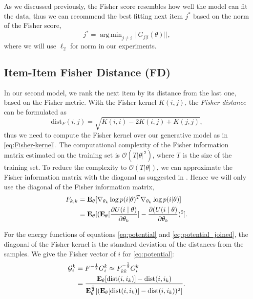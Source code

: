 \documentclass[preprint]{sig-alternate-05-2015}
\DeclareMathOperator*{\argmin}{arg\,min}
\begin{document}
As we discussed previously, the Fisher score resembles how well the model can fit the data, thus we can recommend the best fitting next item $j^{*}$ based on the norm of the Fisher score,
%
\begin{equation}
j^{*} = \argmin_{j \neq i} || G_{j|i}(\theta) ||,
\nonumber
\end{equation}
%
where we will use $\ell_2$ for norm in our experiments.

\subsection{Item-Item Fisher Distance (FD)}
\label{sect:FD}

In our second model, we rank the next item by its distance from the last one, based on the Fisher metric. With the Fisher kernel $K(i,j)$, the \emph{Fisher distance} can be formulated as
\begin{equation}
\mbox{dist}_F(i,j) = \sqrt{K(i,i) - 2 K(i,j) + K(j,j)},
\label{eq:Fisher-dist}
\end{equation}   
%
thus we need to compute the Fisher kernel over our generative model as in \eqref{eq:Fisher-kernel}.  The computational complexity of the Fisher information matrix estimated on the training set is $\mathcal{O}(T |\theta|^2)$, where $T$ is the size of the training set.  To reduce the complexity to $\mathcal{O}(T |\theta|)$, we can approximate the Fisher information matrix with the diagonal as suggested in \cite{JH,perronnin2007fisher}.
Hence we will only use the diagonal of the Fisher information matrix, 
%
\begin{equation}
\begin{split}
    F_{k,k} &={\bf E_{\theta}}[\nabla_{\theta_k} \log p(i|\theta)^T \nabla_{\theta_k} \log p(i|\theta)] \\
    &={\bf E_{\theta}}[({\bf E_{\theta}}[\frac{\partial{U(i \mid \theta)}}{\partial{\theta_k}}] - \frac{\partial{(U(i \mid \theta)}}{\partial{\theta_k}})^2] . \\
\end{split}
\nonumber
\end{equation}

For the energy functions of equations \eqref{eq:potential} and \eqref{eq:potential_joined}, the diagonal of the Fisher kernel is the standard deviation of the distances from the samples. We give the Fisher vector of $i$ for 
\eqref{eq:potential}:
%
\begin{equation}
\begin{split}    
    \mathcal{G}_i^k &= F^{-\frac 12} G_i^k \approx F_{kk}^{-\frac 12} G_i^k\\
    &=\frac {{\bf E_{\theta}}[\mbox{dist}(i,i_k)] - \mbox{dist}(i,i_k)} {{\bf E_{\theta}^{\frac 12}}[({\bf E_{\theta}}[\mbox{dist}(i,i_k)] - \mbox{dist}(i,i_k))^2]}.
    \nonumber
\end{split}
\label{eq:kernel}
\end{equation}
\end{document}
